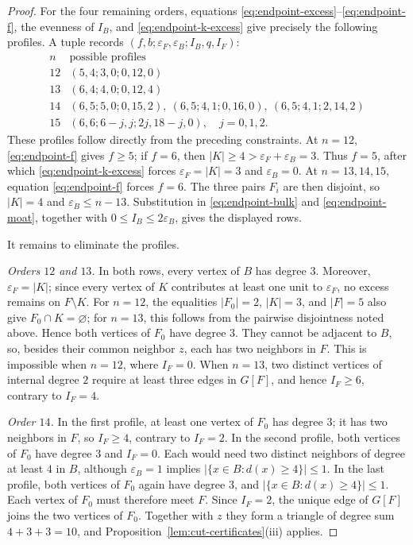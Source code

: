 \begin{proof}
For the four remaining orders, equations
\eqref{eq:endpoint-excess}--\eqref{eq:endpoint-f}, the evenness of
\(I_B\), and \eqref{eq:endpoint-k-excess} give precisely the following
profiles.  A tuple records
\((f,b;\varepsilon_F,\varepsilon_B;I_B,q,I_F)\):
\[
\begin{array}{c|c}
n&\text{possible profiles}\\ \hline
12&(5,4;3,0;0,12,0)\\
13&(6,4;4,0;0,12,4)\\
14&(6,5;5,0;0,15,2),\
    (6,5;4,1;0,16,0),\
    (6,5;4,1;2,14,2)\\
15&(6,6;6-j,j;2j,18-j,0),\quad j=0,1,2.
\end{array}
\]
These profiles follow directly from the preceding constraints.  At \(n=12\),
\eqref{eq:endpoint-f} gives \(f\ge5\); if \(f=6\), then
\(|K|\ge4>\varepsilon_F+\varepsilon_B=3\).  Thus \(f=5\), after which
\eqref{eq:endpoint-k-excess} forces \(\varepsilon_F=|K|=3\) and
\(\varepsilon_B=0\).
At \(n=13,14,15\), equation \eqref{eq:endpoint-f} forces \(f=6\).
The three pairs \(F_i\) are then disjoint, so \(|K|=4\) and
\(\varepsilon_B\le n-13\).  Substitution in
\eqref{eq:endpoint-bulk} and \eqref{eq:endpoint-moat}, together with
\(0\le I_B\le2\varepsilon_B\), gives the displayed rows.

It remains to eliminate the profiles.

\smallskip
\noindent\emph{Orders \(12\) and \(13\).}
In both rows, every vertex of \(B\) has degree \(3\).  Moreover,
\(\varepsilon_F=|K|\); since every vertex of \(K\) contributes at least one
unit to \(\varepsilon_F\), no excess remains on \(F\setminus K\).  For
\(n=12\), the equalities
\(|F_0|=2\), \(|K|=3\), and \(|F|=5\) also give \(F_0\cap K=\varnothing\);
for \(n=13\), this follows from the pairwise disjointness noted above.
Hence both vertices of \(F_0\) have degree
\(3\).  They cannot be adjacent to \(B\), so, besides their common
neighbor \(z\), each has two neighbors in \(F\).  This is impossible
when \(n=12\), where \(I_F=0\).  When \(n=13\), two distinct vertices
of internal degree \(2\) require at least three edges in \(G[F]\), and
hence \(I_F\ge6\), contrary to \(I_F=4\).

\smallskip
\noindent\emph{Order \(14\).}
In the first profile, at least one vertex of \(F_0\) has degree \(3\);
it has two neighbors in \(F\), so \(I_F\ge4\), contrary to \(I_F=2\).
In the second profile, both vertices of \(F_0\) have degree \(3\) and
\(I_F=0\).  Each would need two distinct neighbors of degree at least
\(4\) in \(B\), although \(\varepsilon_B=1\) implies
\(|\{x\in B:d(x)\ge4\}|\le1\).
In the last profile, both vertices of \(F_0\) again have degree \(3\),
and \(|\{x\in B:d(x)\ge4\}|\le1\).  Each vertex
of \(F_0\) must therefore meet \(F\).  Since \(I_F=2\), the unique edge
of \(G[F]\) joins the two vertices of \(F_0\).  Together with \(z\)
they form a triangle of degree sum \(4+3+3=10\), and
  Proposition~\ref{lem:cut-certificates}(iii) applies.


\end{proof}
